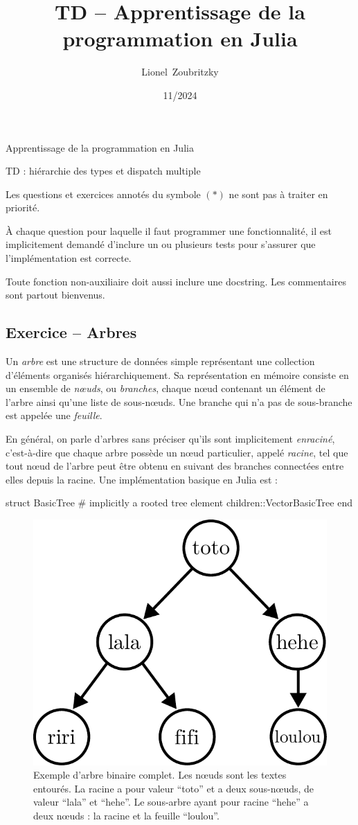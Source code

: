 \documentclass{article}
\title{TD -- Apprentissage de la programmation en Julia}
\author{Lionel~Zoubritzky}
\date{11/2024}
\newcounter{loop}
\newcounter{numEx}
\newcommand{\exo}[1]{
	\stepcounter{numEx}
	\setcounter{loop}{0}
	\subsection*{Exercice \arabic{numEx} -- #1}
}
\newenvironment{repl}{\vspace{-0.6em}\VerbatimEnvironment\begin{jlrepl}}{\end{jlrepl}}
\begin{document}
	
\begin{center}
	\Large Apprentissage de la programmation en Julia
	
	TD  : hiérarchie des types et dispatch multiple
	\vspace{2em}
\end{center}

Les questions et exercices annotés du symbole $(*)$ ne sont pas à traiter en priorité.

À chaque question pour laquelle il faut programmer une fonctionnalité, il est implicitement demandé d'inclure un ou plusieurs tests pour s'assurer que l'implémentation est correcte.

Toute fonction non-auxiliaire doit aussi inclure une docstring. Les commentaires sont partout bienvenus.

\exo{Arbres}

Un \emph{arbre} est une structure de données simple représentant une collection d'éléments organisés hiérarchiquement. Sa représentation en mémoire consiste en un ensemble de \emph{nœuds}, ou \emph{branches}, chaque nœud contenant un élément de l'arbre ainsi qu'une liste de sous-nœuds. Une branche qui n'a pas de sous-branche est appelée une \emph{feuille}.

En général, on parle d'arbres sans préciser qu'ils sont implicitement \emph{enraciné}, c'est-à-dire que chaque arbre possède un nœud particulier, appelé \emph{racine}, tel que tout nœud de l'arbre peut être obtenu en suivant des branches connectées entre elles depuis la racine. Une implémentation basique en Julia est :
\begin{repl}
	struct BasicTree  # implicitly a rooted tree
		element
		children::Vector{BasicTree}
	end
\end{repl}

\begin{figure}[bh]
	\centering
	\includegraphics[width=0.5\linewidth]{../figures/tree.pdf}
	\caption{Exemple d'arbre binaire complet. Les nœuds sont les textes entourés. La racine a pour valeur ``toto'' et a deux sous-nœuds, de valeur ``lala'' et ``hehe''. Le sous-arbre ayant pour racine ``hehe'' a deux nœuds : la racine et la feuille ``loulou''.}
\end{figure}
\end{document}

